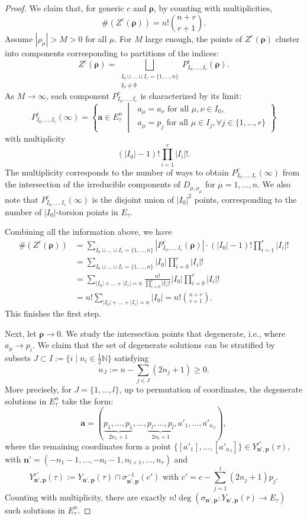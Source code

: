 \documentclass[10pt,a4paper]{amsart}
\begin{document}
\begin{proof}
We claim that, for generic $c$ and $\boldsymbol{\rho}$, by counting with multiplicities, 
\[
\#(Z^c(\boldsymbol{\rho})) = n! \binom{n+r}{r+1}.
\]
Assume $|\rho_\mu| >M>0$ for all $\mu$. For $M$ large enough, the points of $Z^c(\boldsymbol{\rho})$ cluster into components corresponding to partitions of the indices:
\[
Z^c(\boldsymbol{\rho}) = \bigsqcup_{\substack{I_0 \sqcup \dots \sqcup I_r = \{1,\dots,n\} \\ I_0 \neq \emptyset }} P_{I_0,\dots,I_r}^c (\boldsymbol{\rho}).
\]
As $M \to \infty$, each component $P^c_{I_0,\dots,I_r}$ is characterized by its limit:
\[
P_{I_0,\dots,I_r}^c(\infty) = 
\left\{
\mathbf{a}\in E_\tau^n \;\middle|\; 
\begin{array}{l}
a_\mu = a_\nu \text{ for all } \mu, \nu \in I_0, \\
a_\mu = p_j \text{ for all } \mu \in I_j, \forall j \in \{1,\dots,r\}
\end{array}
\right\}
\]
with multiplicity
\[
(|I_0|-1)! \prod_{i=1}^r |I_i|!.
\] 
The multiplicity corresponds to the number of ways to obtain $P_{I_0,\dots,I_r}^c(\infty)$ from the intersection of the irreducible components of $D_{\mu,\rho_\mu}$ for $\mu=1,\dots,n$. We also note that $P_{I_0,\dots,I_r}^c(\infty)$ is the disjoint union of $|I_0|^2$ points, corresponding to the number of $|I_0|$-torsion points in $E_\tau$.

Combining all the information above, we have 
\[
\begin{split}
\#(Z^c(\boldsymbol{\rho})) &=  \sum_{I_0 \sqcup \dots \sqcup I_r = \{1,\dots,n\}} | P_{I_0,\dots,I_r}^c (\boldsymbol{\rho}) | \cdot (|I_0|-1)! \prod_{i=1}^r |I_i|!
\\
&= \sum_{I_0 \sqcup \dots \sqcup I_r = \{1,\dots,n\}}   |I_0|\prod_{i=0}^r |I_i|!
\\
&= \sum_{|I_0|+\dots+|I_r|=n} \frac{n!}{\prod_{i=0}^r |I_i|!} |I_0|\prod_{i=0}^r |I_i|!
\\
&= n! \sum_{|I_0|+\dots+|I_r|=n} |I_0| = n! \binom{n+r}{r+1}.
\end{split}
\]
This finishes the first step.

Next, let $\boldsymbol{\rho} \to 0$. We study the intersection points that degenerate, i.e., where $a_\mu \to p_i$. We claim that the set of degenerate solutions can be stratified by subsets $J \subset I := \{ i \mid n_i \in  \tfrac{1}{2} \mathbb{N} \}$ satisfying 
\[
n_J := n - \sum_{j \in J} (2n_j+1) \ge 0.
\]
More precisely, for $J=\{ 1,\dots,l \}$, up to permutation of coordinates, the degenerate solutions in $E_\tau^n$ take the form:
\[
    \mathbf{a} = (\underbrace{p_1, \dots, p_1}_{2n_1+1}, \dots, \underbrace{p_l, \dots, p_l}_{2n_l+1}, a'_1, \dots, a'_{n_J}),
\]
where the remaining coordinates form a point $\{[a'_1], \dots, [a'_{n_J}]\} \in Y_{\mathbf{n}',\mathbf{p}}^{c'}(\tau)$,
with $\mathbf{n}' = ( -n_1-1,\dots,-n_l-1,n_{l+1}, \dots,n_r )$ and 
\[
    Y_{\mathbf{n}',\mathbf{p}}^{c'}(\tau) := Y_{\mathbf{n}',\mathbf{p}}(\tau) \cap \sigma_{\mathbf{n}',\mathbf{p}}^{-1}(c') \text{ with }  c' = c- \sum_{j=1}^l (2n_j+1) p_j.
\]
Counting with multiplicity, there are exactly $n! \deg (\sigma_{\mathbf{n}',\mathbf{p}}: Y_{\mathbf{n}',\mathbf{p}}(\tau) \to E_\tau)$ such solutions in $E_\tau^n$.


\end{proof}
\end{document}
